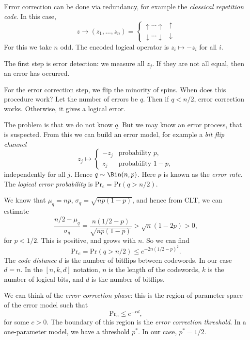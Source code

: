 \documentclass[12pt]{article}
\begin{document}
Error correction can be done via redundancy, for example the \emph{classical repetition code}. In this case,
\[
z \to (z_1, \ldots, z_n) =
\begin{cases}
	\uparrow \cdots \uparrow & \uparrow \\
	\downarrow \cdots \downarrow & \downarrow
\end{cases}
\]
For this we take $n$ odd. The encoded logical operator is $z_i \mapsto - z_i$ for all $i$.

The first step is error detection: we measure all $z_j$. If they are not all equal, then an error has occurred.

For the error correction step, we flip the minority of spins. When does this procedure work? Let the number of errors be $q$. Then if $q < n/2$, error correction works. Otherwise, it gives a logical error.

The problem is that we do not know $q$. But we may know an error process, that is suspected. From this we can build an error model, for example a \emph{bit flip channel}
\[
z_j \mapsto
\begin{cases}
	-z_j & \text{probability } p, \\
	z_j & \text{probability } 1- p,
\end{cases}
\]
independently for all $j$. Hence $q \sim \Bin(n, p)$. Here $p$ is known as the \emph{error rate}. The \emph{logical error probability} is $\mathrm{Pr}_e = \mathrm{Pr}(q > n/2)$.

We know that $\mu_q = np$, $\sigma_q = \sqrt{n p (1 - p)}$, and hence from CLT, we can estimate
\[
	\frac{n/2 - \mu_q}{\sigma_q} = \frac{n(1/2 - p)}{\sqrt{n p(1-p)}} > \sqrt n (1 - 2p) > 0,
\]
for $p < 1/2$. This is positive, and grows with $n$. So we can find
\[
\mathrm{Pr}_e = \mathrm{Pr} (q > n/2) \leq e^{-2 n (1/2 - p)^2}.
\]
The \emph{code distance} $d$ is the number of bitflips between codewords. In our case $d = n$. In the $[n, k, d]$ notation, $n$ is the length of the codewords, $k$ is the number of logical bits, and $d$ is the number of bitflips.

We can think of the \emph{error correction phase}: this is the region of parameter space of the error model such that
\[
\mathrm{Pr}_e \leq e^{-c d},
\]
for some $c > 0$. The boundary of this region is the \emph{error correction threshold}. In a one-parameter model, we have a threshold $p^{\ast}$. In our case, $p^{\ast} = 1/2$.
\end{document}
